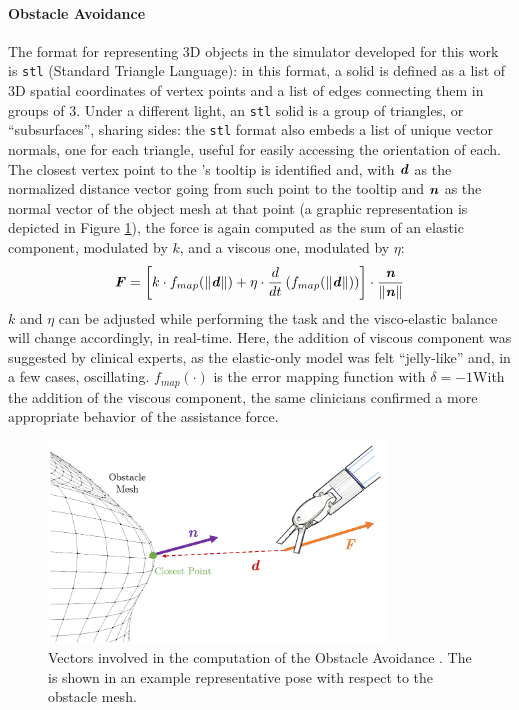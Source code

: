 \documentclass[../main.tex]{subfiles}
\begin{document}
\paragraph{Obstacle Avoidance} The format for representing 3D objects in the simulator developed for this work is \texttt{stl} (Standard Triangle Language): in this format, a solid is defined as a list of 3D spatial coordinates of vertex points and a list of edges connecting them in groups of 3. Under a different light, an \texttt{stl} solid is a group of triangles, or ``subsurfaces'', sharing sides: the \texttt{stl} format also embeds a list of unique vector normals, one for each triangle, useful for easily accessing the orientation of each. The closest vertex point to the \psm's tooltip is identified and, with $\textbf{\textit{d}}$ as the normalized distance vector going from such point to the tooltip and $\textbf{\textit{n}}$ as the normal vector of the object mesh at that point (a graphic representation is depicted in Figure \ref{fig:obstacleavoidance}), the force is again computed as the sum of an elastic component, modulated by $k$, and a viscous one, modulated by $\eta$:
\begin{equation}
    \textbf{\textit{F}} = \left[k\cdot f_{map}(\|\textbf{\textit{d}}\|) + \eta\cdot \frac{d}{dt} \left( f_{map}(\|\textbf{\textit{d}}\|)\right)\right]\cdot \frac{\textbf{\textit{n}}}{\|\textbf{\textit{n}}\|} 
    \label{eq:obstacleavoidancef}
\end{equation}
$k$ and $\eta$ can be adjusted while performing the task and the visco-elastic balance will change accordingly, in real-time. Here, the addition of viscous component was suggested by clinical experts, as the elastic-only model was felt ``jelly-like'' and, in a few cases, oscillating. $f_{map}(\cdot)$ is the error mapping function with $\delta=-1$With the addition of the viscous component, the same clinicians confirmed a more appropriate behavior of the assistance force.

\begin{figure}
    \centering
    \includegraphics[width=0.8\textwidth]{images/obstacle_avoidance.png}
    \caption{Vectors involved in the computation of the Obstacle Avoidance \vf. The \psm is shown in an example representative pose with respect to the obstacle mesh.}
    \label{fig:obstacleavoidance}
\end{figure}
\end{document}
